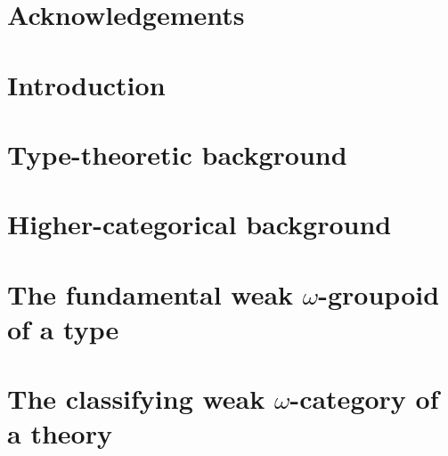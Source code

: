 \documentclass[11pt]{amsbook}
\begin{document}

\tableofcontents



%
%

\chapter*{Acknowledgements}


\mainmatter

\chapter*{Introduction}





\chapter{Type-theoretic background}
\label{ch:dtt-background}



\chapter{Higher-categorical background}
\label{ch:cat-background}



\chapter{The fundamental weak \texorpdfstring{$\omega$}{ω}-groupoid of a type} \label{ch:fundamental}



\chapter{The classifying weak \texorpdfstring{$\omega$}{ω}-category of a theory} \label{ch:classifying}






















\backmatter




\end{document}
